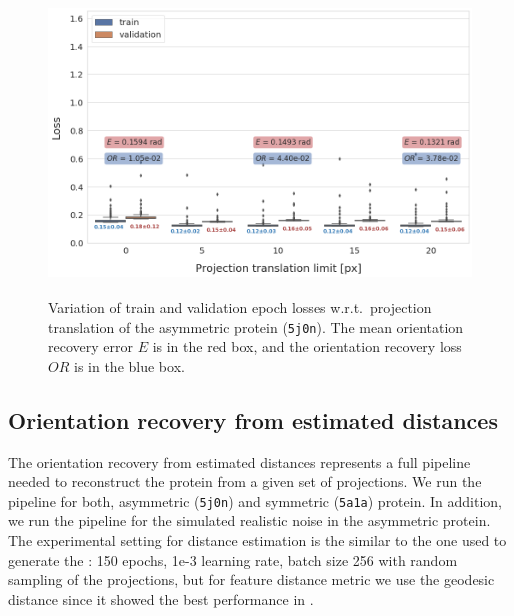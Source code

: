\begin{figure}
    \centering
        \includegraphics[height=8cm]{images/de_translation_nums.png}
        \caption{
        Variation of train and validation epoch losses w.r.t.\ projection translation of the asymmetric protein (\texttt{5j0n}). The mean orientation recovery error $E$ is in the red box, and the orientation recovery loss $OR$ is in the blue box.
    }\label{fig:distance-estimation-vary-projection-translation}
\end{figure}


\subsection{Orientation recovery from estimated distances}


The orientation recovery from estimated distances represents a full pipeline needed to reconstruct the protein from a given set of projections.
We run the pipeline for both, asymmetric (\texttt{5j0n}) and symmetric (\texttt{5a1a}) protein.
In addition, we run the pipeline for the simulated realistic noise in the asymmetric protein.
The experimental setting for distance estimation is the similar to the one used to generate the : 150 epochs, 1e-3 learning rate, batch size 256 with random sampling of the projections, but for feature distance metric we use the geodesic distance since it showed the best performance in .

